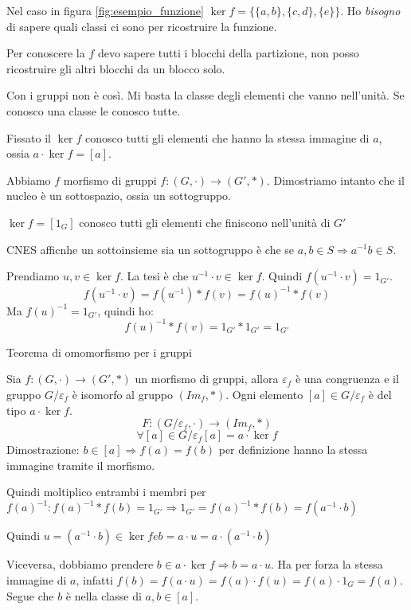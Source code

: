 Nel caso in figura \ref{fig:esempio_funzione} $\ker f = \{ \{a, b \}, \{ c, d \}, \{ e \}\}$. Ho \textit{bisogno} di sapere quali classi ci sono per ricostruire la funzione.

Per conoscere la $f$ devo sapere tutti i blocchi della partizione, non posso ricostruire gli altri blocchi da un blocco solo.

Con i gruppi non \`e cos\`i. Mi basta la classe degli elementi che vanno nell'unit\`a. Se conosco una classe le conosco tutte.

Fissato il $\ker f$ conosco tutti gli elementi che hanno la stessa immagine di $a$, ossia $a \cdot \ker f = [a]$.

Abbiamo $f$ morfismo di gruppi $ f : (G, \cdot ) \to (G', \ast)$. Dimostriamo intanto che il nucleo \`e un sottospazio, ossia un sottogruppo.

$\ker f = [1_G]$ conosco tutti gli elementi che finiscono nell'unit\`a di $G'$

CNES afficnhe un sottoinsieme sia un sottogruppo \`e che se $a, b \in S \Rightarrow a^{-1} b \in S$.

Prendiamo $u, v \in \ker f$. La tesi \`e che $u^{-1} \cdot v \in \ker f$. Quindi $f ( u^{-1} \cdot v ) = 1_{G'}$.
\[
f( u^{-1} \cdot v ) = f(u^{-1}) \ast f(v) = f(u)^{-1} \ast f(v)
\]
Ma $f(u)^{-1} = 1_{G'}$, quindi ho:
\[
f(u)^{-1} \ast f(v) = 1_{G'} \ast 1_{G'} = 1_{G'}
\]

Teorema di omomorfismo per i gruppi

Sia $f : (G, \cdot) \to (G', \ast)$ un morfismo di gruppi, allora $\varepsilon_f$ \`e una congruenza e il gruppo $G / \varepsilon_f$ \`e isomorfo al gruppo $(Im_f, \ast)$. Ogni elemento $[a] \in G / \varepsilon_f$ \`e del tipo $a \cdot \ker f$.
\[
F : (G / \varepsilon_f, \cdot) \to (Im_f, \ast)
\]
\[
\forall [a] \in G / \varepsilon_f [a] = a \cdot \ker f
\]
Dimostrazione:
$b \in [a] \Rightarrow f(a) = f(b)$ per definizione hanno la stessa immagine tramite il morfismo.

Quindi moltiplico entrambi i membri per $f(a)^{-1}: f(a)^{-1} \ast f(b) = 1_{G'} \Rightarrow 1_{G'} = f(a)^{-1} \ast f(b) = f(a^{-1} \cdot b)$

Quindi $u = (a^{-1} \cdot b ) \in \ker f e b = a \cdot u = a \cdot (a^{-1} \cdot b)$

Viceversa, dobbiamo prendere $b \in a \cdot \ker f \Rightarrow b = a \cdot u$. Ha per forza la stessa immagine di $a$, infatti $f(b) = f(a \cdot u) = f(a) \cdot f(u) = f(a) \cdot 1_G = f(a)$. Segue che $b$ \`e nella classe di $a, b \in [a]$.

